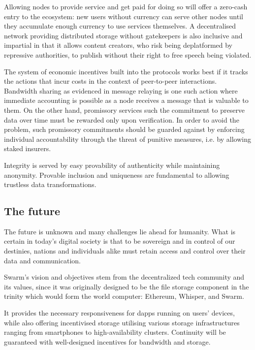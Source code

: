 Allowing nodes to provide service and get paid for doing so will offer a zero-cash entry to the ecosystem: new users without currency can serve other nodes until they accumulate enough currency to use services themselves. A decentralised network providing distributed storage without gatekeepers is also inclusive and impartial in that it allows content creators, who risk being deplatformed by repressive  authorities, to publish without their right to free speech being violated. 

The system of economic incentives built into the protocols works best if it tracks the actions that incur costs in the context of peer-to-peer interactions. Bandwidth sharing as evidenced in message relaying is one such action where immediate accounting is possible as a node receives a message that is valuable to them. On the other hand, promissory services such the commitment to preserve data over time must be rewarded only upon verification. In order to avoid the  problem, such promissory commitments should be guarded against by enforcing individual accountability through the threat of punitive measures, i.e. by allowing staked insurers.

Integrity is served by easy provability of authenticity while maintaining anonymity.
Provable inclusion and uniqueness are fundamental to allowing trustless data transformations.


\subsection{The future} \label{sec:future}

The future is unknown and many challenges lie ahead for humanity. What is certain in today's digital society is that to be sovereign and in control of our destinies, nations and individuals alike must retain access and control over their data and communication.

Swarm's vision and objectives stem from the decentralized tech community and its values, since it was originally designed to be the file storage component in the trinity which would form the world computer: Ethereum, Whisper, and Swarm.

It provides the necessary responsiveness for dapps running on users' devices, while also offering incentivised storage utilising various storage infrastructures ranging from smartphones to high-availability clusters. Continuity will be guaranteed with well-designed incentives for bandwidth and storage.

